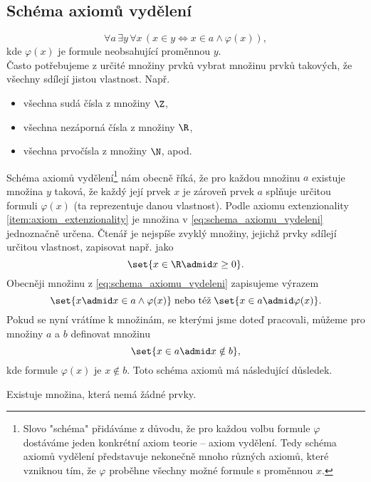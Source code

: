 \subsection{Schéma axiomů vydělení}
\begin{equation}\label{eq:schema_axiomu_vydeleni}
    \forall a\,\exists y\,\forall x\,(x\in y \iff x\in a \land \varphi(x)),
\end{equation}
kde $\varphi(x)$ je formule neobsahující proměnnou $y$.\\
Často potřebujeme z určité množiny prvků vybrat množinu prvků takových, že všechny sdílejí jistou vlastnost. Např.
\begin{itemize}
    \item všechna sudá čísla z množiny $\Z$,
    \item všechna nezáporná čísla z množiny $\R$,
    \item všechna prvočísla z množiny $\N$, apod.
\end{itemize}
Schéma axiomů vydělení\footnote{Slovo "schéma" přidáváme z důvodu, že pro každou volbu formule $\varphi$ dostáváme jeden konkrétní axiom teorie -- axiom vydělení. Tedy schéma axiomů vydělení představuje nekonečně mnoho různých axiomů, které vzniknou tím, že $\varphi$ proběhne všechny možné formule s proměnnou $x$.} nám obecně říká, že pro každou množinu $a$ existuje množina $y$ taková, že každý její prvek $x$ je zároveň prvek $a$ splňuje určitou formuli $\varphi(x)$ (ta reprezentuje danou vlastnost). Podle axiomu extenzionality \ref{item:axiom_extenzionality} je množina v \eqref{eq:schema_axiomu_vydeleni} jednoznačně určena. Čtenář je nejspíše zvyklý množiny, jejichž prvky sdílejí určitou vlastnost, zapisovat např. jako
\begin{equation*}
    \set{x\in\R \admid x\geq 0}.
\end{equation*}
Obecněji množinu z \eqref{eq:schema_axiomu_vydeleni} zapisujeme výrazem
\begin{equation*}
    \set{x \admid x\in a \land \varphi(x)}\;\text{nebo též}\;\set{x\in a\admid \varphi(x)}.
\end{equation*}
Pokud se nyní vrátíme k množinám, se kterými jsme doteď pracovali, můžeme pro množiny $a$ a $b$ definovat množinu
\begin{equation*}
    \set{x\in a\admid x\notin b},
\end{equation*}
kde formule $\varphi(x)$ je $x\notin b$. Toto schéma axiomů má následující důsledek.
\needspace{6mm}
\begin{corollary}
    Existuje množina, která nemá žádné prvky.
\end{corollary}
